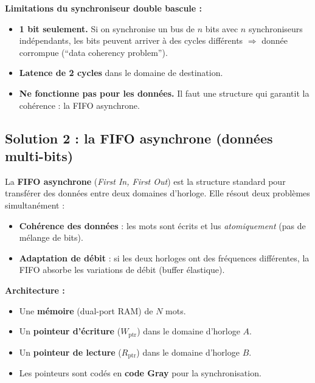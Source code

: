 \documentclass[12pt,a4paper,twoside]{book}
\begin{document}
\begin{attention}
\textbf{Limitations du synchroniseur double bascule :}
\begin{itemize}[nosep]
\item \textbf{1 bit seulement.} Si on synchronise un bus de $n$ bits avec $n$ synchroniseurs indépendants, les bits peuvent arriver à des cycles différents $\Rightarrow$ donnée corrompue (``data coherency problem'').
\item \textbf{Latence de 2 cycles} dans le domaine de destination.
\item \textbf{Ne fonctionne pas pour les données.} Il faut une structure qui garantit la cohérence : la FIFO asynchrone.
\end{itemize}
\end{attention}

\subsection{Solution 2 : la FIFO asynchrone (données multi-bits)}

\begin{formule}
La \textbf{FIFO asynchrone} (\textit{First In, First Out}) est la structure standard pour transférer des données entre deux domaines d'horloge. Elle résout deux problèmes simultanément :
\begin{itemize}[nosep]
\item \textbf{Cohérence des données} : les mots sont écrits et lus \textit{atomiquement} (pas de mélange de bits).
\item \textbf{Adaptation de débit} : si les deux horloges ont des fréquences différentes, la FIFO absorbe les variations de débit (buffer élastique).
\end{itemize}

\textbf{Architecture :}
\begin{itemize}[nosep]
\item Une \textbf{mémoire} (dual-port RAM) de $N$ mots.
\item Un \textbf{pointeur d'écriture} ($W_{\text{ptr}}$) dans le domaine d'horloge $A$.
\item Un \textbf{pointeur de lecture} ($R_{\text{ptr}}$) dans le domaine d'horloge $B$.
\item Les pointeurs sont codés en \textbf{code Gray} pour la synchronisation.
\end{itemize}
\end{formule}
\end{document}
